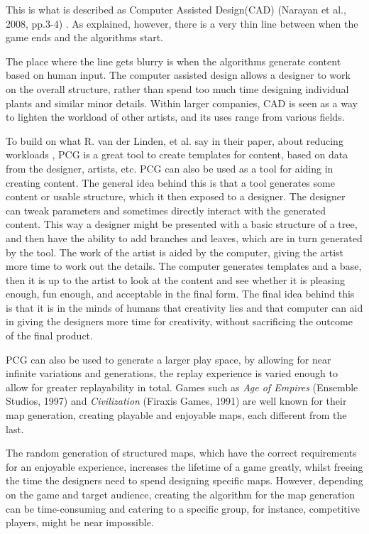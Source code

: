 This is what is described as Computer Assisted Design(CAD) (Narayan et al., 2008, pp.3-4) \cite{book:cad}. As explained, however, there is a very thin line between when the game ends and the algorithms start. 

The place where the line gets blurry is when the algorithms generate content based on human input. The computer assisted design allows a designer to work on the overall structure, rather than spend too much time designing individual plants and similar minor details.
Within larger companies, CAD is seen as a way to lighten the workload of other artists, and its uses range from various fields.

To build on what R. van der Linden, et al. say in their paper, about reducing workloads \cite{art:pcg}, PCG is a great tool to create templates for content, based on data from the designer, artists, etc. PCG can also be used as a tool for aiding in creating content.
The general idea behind this is that a tool generates some content or usable structure, which it then exposed to a designer. The designer can tweak parameters and sometimes directly interact with the generated content. This way a designer might be presented with a basic structure of a tree, and then have the ability to add branches and leaves, which are in turn generated by the tool. 
The work of the artist is aided by the computer, giving the artist more time to work out the details. The computer generates templates and a base, then it is up to the artist to look at the content and see whether it is pleasing enough, fun enough, and acceptable in the final form. The final idea behind this is that it is in the minds of humans that creativity lies and that computer can aid in giving the designers more time for creativity, without sacrificing the outcome of the final product. 

PCG can also be used to generate a larger play space, by allowing for near infinite variations and generations, the replay experience is varied enough to allow for greater replayability in total. Games such as \textit{Age of Empires} (Ensemble Studios, 1997) \cite{game:empires} and \textit{Civilization} (Firaxis Games, 1991) \cite{game:civ} are well known for their map generation, creating playable and enjoyable maps, each different from the last. 

The random generation of structured maps, which have the correct requirements for an enjoyable experience, increases the lifetime of a game greatly, whilst freeing the time the designers need to spend designing specific maps. However, depending on the game and target audience, creating the algorithm for the map generation can be time-consuming and catering to a specific group, for instance, competitive players, might be near impossible.

